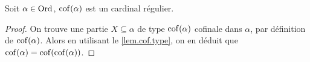 \begin{property}
  Soit $\alpha\in\operatorname{Ord}$, $\operatorname{cof}(\alpha)$ est un cardinal régulier.
\end{property}

\begin{proof}
  On trouve une partie $X\subseteq\alpha$ de type $\operatorname{cof}(\alpha)$ cofinale dans
  $\alpha$, par définition de $\operatorname{cof}(\alpha)$. Alors en utilisant le
  \cref{lem.cof.type}, on en déduit que $\operatorname{cof}(\alpha) = \operatorname{cof}(\operatorname{cof}(\alpha))$.
\end{proof}
